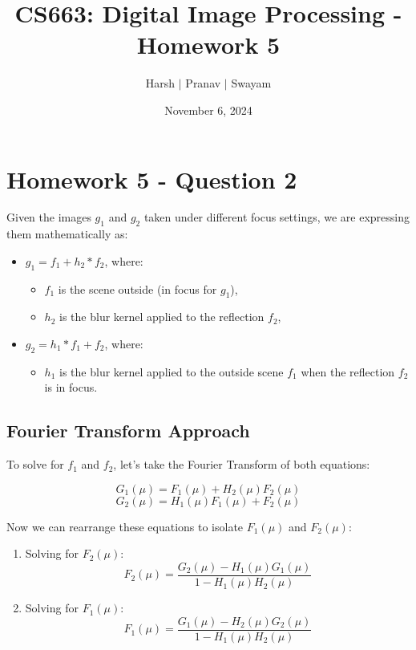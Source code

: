 \documentclass{article}
\title{CS663: Digital Image Processing - Homework 5}
\author{Harsh $\vert$ Pranav $\vert$ Swayam}
\date{November 6, 2024}
\begin{document}
\maketitle
\flushleft
\section*{Homework 5 - Question 2}

Given the images \( g_1 \) and \( g_2 \) taken under different focus settings, we are expressing them mathematically as:

\begin{itemize}
    \item \( g_1 = f_1 + h_2 * f_2 \), where:
        \begin{itemize}
            \item \( f_1 \) is the scene outside (in focus for \( g_1 \)),
            \item \( h_2 \) is the blur kernel applied to the reflection \( f_2 \),
        \end{itemize}
    \item \( g_2 = h_1 * f_1 + f_2 \), where:
        \begin{itemize}
            \item \( h_1 \) is the blur kernel applied to the outside scene \( f_1 \) when the reflection \( f_2 \) is in focus.
        \end{itemize}
\end{itemize}

\subsection*{Fourier Transform Approach}

To solve for \( f_1 \) and \( f_2 \), let's take the Fourier Transform of both equations:

\[
G_1(\mu) = F_1(\mu) + H_2(\mu) F_2(\mu)
\]
\[
G_2(\mu) = H_1(\mu) F_1(\mu) + F_2(\mu)
\]

Now we can rearrange these equations to isolate \( F_1(\mu) \) and \( F_2(\mu) \):

\begin{enumerate}
    \item Solving for \( F_2(\mu) \):
    \[
    F_2(\mu) = \frac{G_2(\mu) - H_1(\mu) G_1(\mu)}{1 - H_1(\mu) H_2(\mu)}
    \]
    \item Solving for \( F_1(\mu) \):
    \[
    F_1(\mu) = \frac{G_1(\mu) - H_2(\mu) G_2(\mu)}{1 - H_1(\mu) H_2(\mu)}
    \]
\end{enumerate}
\end{document}
